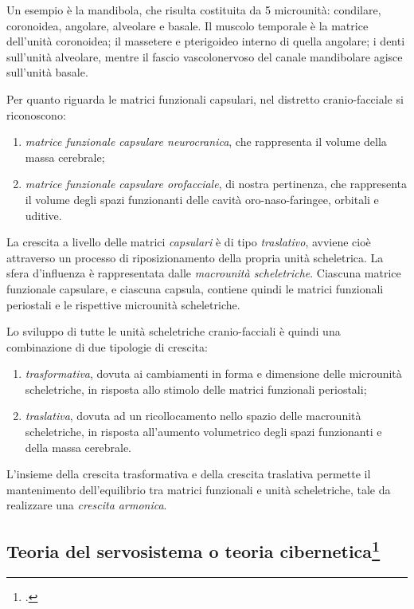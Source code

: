 Un esempio è la mandibola, che risulta costituita da 5 microunità: condilare, coronoidea, angolare, alveolare e basale. Il muscolo temporale è la matrice dell'unità coronoidea; il massetere e pterigoideo interno di quella angolare; i denti sull'unità alveolare, mentre il fascio vascolonervoso del canale mandibolare agisce sull'unità basale.

Per quanto riguarda le matrici funzionali capsulari, nel distretto cranio-facciale si riconoscono:

\begin{enumerate}
\item \textit{matrice funzionale capsulare neurocranica}, che rappresenta il volume della massa cerebrale;
\item \textit{matrice funzionale capsulare orofacciale}, di nostra pertinenza, che rappresenta il volume degli spazi funzionanti delle cavità oro-naso-faringee, orbitali e uditive.
\end{enumerate}

La crescita a livello delle matrici \textit{capsulari} è di tipo \textit{traslativo}, avviene cioè attraverso un processo di riposizionamento della propria unità scheletrica. La sfera d'influenza è rappresentata dalle \textit{macrounità scheletriche}. Ciascuna matrice funzionale capsulare, e ciascuna capsula, contiene quindi le matrici funzionali periostali e le rispettive microunità scheletriche.

Lo sviluppo di tutte le unità scheletriche cranio-facciali è quindi una combinazione di due tipologie di crescita:

\begin{enumerate}
\item \textit{trasformativa}, dovuta ai cambiamenti in forma e dimensione delle microunità scheletriche, in risposta allo stimolo delle matrici funzionali periostali;
\item \textit{traslativa}, dovuta ad un ricollocamento nello spazio delle macrounità scheletriche, in risposta all'aumento volumetrico degli spazi funzionanti e della massa cerebrale.
\end{enumerate}

L'insieme della crescita trasformativa e della crescita traslativa permette il mantenimento dell'equilibrio tra matrici funzionali e unità scheletriche, tale da realizzare una \textit{crescita armonica}.

\subsection*{Teoria del servosistema o teoria cibernetica\protect\footcite{Petrovic1974,Petrovic1981}}

